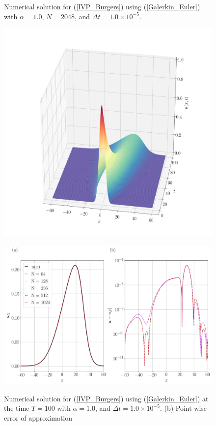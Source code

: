 	\begin{figure}[H]
		\centering
		\caption{Numerical solution for (\ref{IVP_Burgers}) using (\ref{Galerkin_Euler}) with $\alpha = 1.0$, $N=2048$, and $\Delta t = 1.0 \times 10^{-5}$.}
		\includegraphics[width=12cm]{burgers_equation/deterministic/numerical_experiments/viscid/figures/galerkin/Numerical_Solution_alpha=1.png}
		\label{Galerkin_alpha=1}
		\caption{Numerical solution for (\ref{IVP_Burgers}) using (\ref{Galerkin_Euler}) at the time $T = 100$ with $\alpha = 1.0$, and $\Delta t = 1.0 \times 10^{-5}$. (b) Point-wise error of approximation}
		\includegraphics[width=12.5cm]{burgers_equation/deterministic/numerical_experiments/viscid/figures/galerkin/Numerical_Solution_alpha=1_T=100.png}
		\label{Galerkin_alpha=1_T}
	\end{figure}

